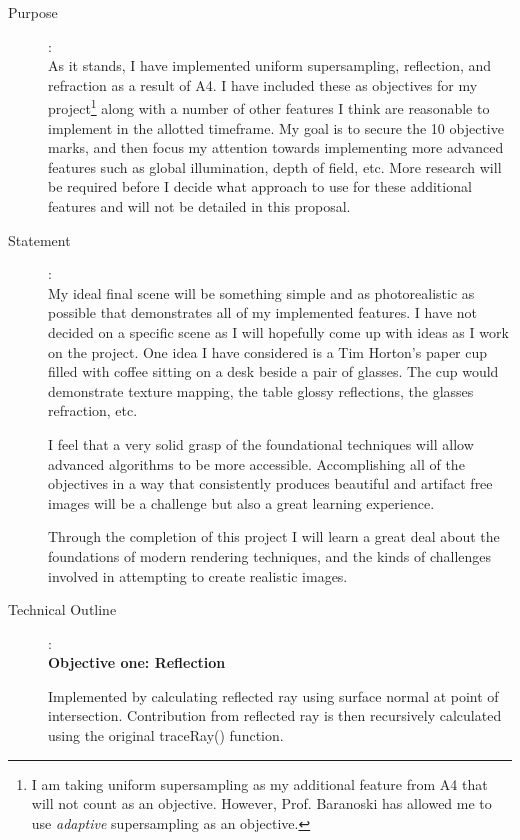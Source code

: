 \documentclass {article}
\begin{document}
\newpage
{}
\begin{description}
\item[Purpose]:\\

	As it stands, I have implemented uniform supersampling, reflection, and refraction as a result of A4. I have included these as objectives for my project\footnote{I am taking uniform supersampling as my additional feature from A4 that will not count as an objective. However, Prof. Baranoski has allowed me to use \textit{adaptive} supersampling as an objective.} along with a number of other features I think are reasonable to implement in the allotted timeframe. My goal is to secure the 10 objective marks, and then focus my attention towards implementing more advanced features such as global illumination, depth of field, etc. More research will be required before I decide what approach to use for these additional features and will not be detailed in this proposal.

\item[Statement]:\\

	My ideal final scene will be something simple and as photorealistic as possible that demonstrates all of my implemented features. I have not decided on a specific scene as I will hopefully come up with ideas as I work on the project. One idea I have considered is a Tim Horton's paper cup filled with coffee sitting on a desk beside a pair of glasses. The cup would demonstrate texture mapping, the table glossy reflections, the glasses refraction, etc.

	I feel that a very solid grasp of the foundational techniques will allow advanced algorithms to be more accessible. Accomplishing all of the objectives in a way that consistently produces beautiful and artifact free images will be a challenge but also a great learning experience.

	Through the completion of this project I will learn a great deal about the foundations of modern rendering techniques, and the kinds of challenges involved in attempting to create realistic images.

\item[Technical Outline]:\\
     
{\bf Objective one: Reflection}

Implemented by calculating reflected ray using surface normal at point of intersection. Contribution from reflected ray is then recursively calculated using the original traceRay() function. 


\end{description}
\end{document}
